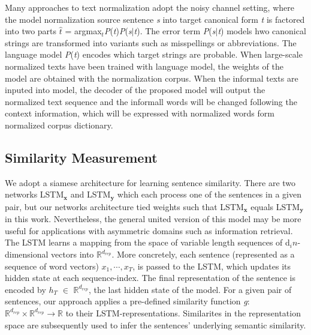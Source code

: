 \documentclass[letterpaper]{article}
\begin{document}
Many approaches to text normalization adopt the noisy channel setting, where the model normalization source sentence \textit{s} into target canonical form \textit{t} is factored into two parts $\hat{t}$ = argmax$_{t}$\textit{P}(\textit{t})\textit{P}(\textit{s}$\vert$\textit{t}). The error term \textit{P}(\textit{s}$\vert$\textit{t}) models hwo canonical strings are transformed into variants such as misspellings or abbreviations. The language model \textit{P}(\textit{t}) encodes which target strings are probable. When large-scale normalized texts have been trained with language model, the weights of the model are obtained with the normalization corpus. When the informal texts are inputed into model, the decoder of the proposed model will output the normalized text sequence and the informall words will be changed following the context information, which will be expressed with normalized words form normalized corpus dictionary.

\subsection{Similarity Measurement}
We adopt a siamese architecture for learning sentence similarity. There are two networks LSTM$_\textbf{x}$ and LSTM$_\textbf{y}$ which each process one of the sentences in a given pair, but our networks architecture tied weights such that LSTM$_\textbf{x}$ equals LSTM$_\textbf{y}$ in this work. Nevertheless, the general united version of this model may be more useful for applications with asymmetric domains such as information retrieval. The LSTM learns a mapping from the space of variable length sequences of d$_in$-dimensional vectors into $\mathbb{R}^{d_{rep}}$. More concretely, each sentence (represented as a sequence of word vectors) \textit{$x_{1},\cdots,x_{T}$}, is passed to the LSTM, which updates its hidden state at each sequence-index. The final representation of the sentence is encoded by \textit{$h_{T}$} $\in$ $\mathbb{R}^{d_{rep}}$, 
the last hidden state of the model. For a given pair of sentences, our approach applies a pre-defined similarity function \textit{g}: $\mathbb{R}^{d_{rep}}\times\mathbb{R}^{d_{rep}}\rightarrow\mathbb{R}$ to their LSTM-representations. Similarites in the representation space are subsequently used to infer the sentences' underlying semantic similarity.
\end{document}

